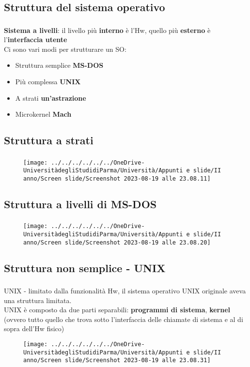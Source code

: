 \documentclass{beamer}
\newenvironment{mainframe}{
	\begin{frame}
		\frametitle{\insertsubsection}
		\framesubtitle{\insertsection}
	}{
	\end{frame}
}
\begin{document}
\subsection{Struttura del sistema operativo}
\begin{mainframe}
	\textbf{Sistema a livelli}: il livello più \textbf{interno} è l'Hw, quello più \textbf{esterno} è l'\textbf{interfaccia utente}\\
	Ci sono vari modi per strutturare un SO:
	\begin{itemize}
		\item Struttura semplice \textbf{MS-DOS}
		\item Più complessa \textbf{UNIX}
		\item A strati \textbf{un'astrazione}
		\item Microkernel \textbf{Mach}
	\end{itemize}
\end{mainframe}
\subsection{Struttura a strati}
\begin{mainframe}
	\begin{figure}
		\centering
		\texttt{[image: ../../../../../../OneDrive-UniversitàdegliStudidiParma/Università/Appunti e slide/II anno/Screen slide/Screenshot 2023-08-19 alle 23.08.11]}
	\end{figure}
\end{mainframe}
\subsection{Struttura a livelli di MS-DOS}
\begin{mainframe}
	\begin{figure}
		\centering
		\texttt{[image: ../../../../../../OneDrive-UniversitàdegliStudidiParma/Università/Appunti e slide/II anno/Screen slide/Screenshot 2023-08-19 alle 23.08.20]}
	\end{figure}
\end{mainframe}
\subsection{Struttura non semplice - UNIX}
\begin{mainframe}
	UNIX - limitato dalla funzionalità Hw, il sistema operativo UNIX originale aveva una struttura limitata.\\
	UNIX è composto da due parti separabili: \textbf{programmi di sistema}, \textbf{kernel} (ovvero tutto quello che trova sotto l'interfaccia delle chiamate di sistema e al di sopra dell'Hw fisico)
\end{mainframe}
\begin{frame}
	\begin{figure}
		\centering
		\texttt{[image: ../../../../../../OneDrive-UniversitàdegliStudidiParma/Università/Appunti e slide/II anno/Screen slide/Screenshot 2023-08-19 alle 23.08.31]}
	\end{figure}
\end{frame}
\end{document}
